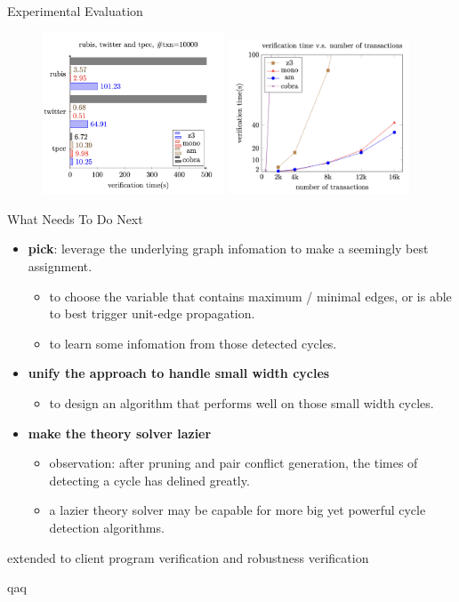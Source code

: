 \begin{frame}{Experimental Evaluation}
	\begin{figure}[H]
		\centering
		\includegraphics[width=0.48\textwidth]{figs/ser-checker-rubis-twitter-and-tpcc-ntxn10000.png}
		\includegraphics[width=0.48\textwidth]{figs/ser-checker-chengRW-verification-time-vs-ntxns.png}
	\end{figure}
\end{frame}

\begin{frame}{What Needs To Do Next}
	\begin{itemize}
		\item \textbf{pick}: leverage the underlying graph infomation to make a seemingly best assignment.
		\begin{itemize}
			\item to choose the variable that contains maximum / minimal edges, or is able to best trigger unit-edge propagation. 
			\item to learn some infomation from those detected cycles.
		\end{itemize}
		\item \textbf{unify the approach to handle small width cycles}
		\begin{itemize}
			\item to design an algorithm that performs well on those small width cycles.
		\end{itemize}
		\item \textbf{make the theory solver lazier}
		\begin{itemize}
			\item observation: after pruning and pair conflict generation, the times of detecting a cycle has delined greatly.
			\item a lazier theory solver may be capable for more big yet powerful cycle detection algorithms.  
		\end{itemize}
	\end{itemize}
\end{frame}

\begin{frame}
	extended to client program verification and robustness verification

	qaq
\end{frame}
